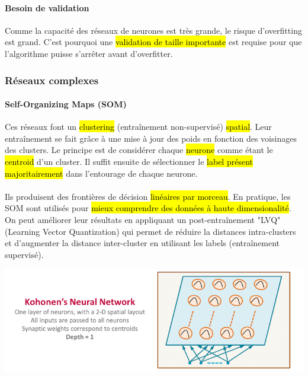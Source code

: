 \documentclass[letterpaper, 12pt]{article}
\newcommand{\alinea}{
\hspace*{0.5cm}}
\begin{document}
				\paragraph{Besoin de validation} Comme la capacité des réseaux de neurones est très grande, le risque d'overfitting est
						grand. 
						C'est pourquoi une \hl{validation de taille importante} est requise pour que l'algorithme puisse s'arrêter
						avant d'overfitter.
			\subsubsection{Réseaux complexes}
				\paragraph{Self-Organizing Maps (SOM)} Ces réseaux font un \hl{clustering} (entraînement non-supervisé) \hl{spatial}. 
						Leur entraînement se fait grâce à une mise à jour des poids en fonction des voisinages des clusters.
						Le principe est de considérer chaque \hl{neurone} comme étant le \hl{centroid} d'un cluster.
						Il suffit ensuite de sélectionner le \hl{label présent majoritairement} dans l'entourage de chaque neurone.\\
					~\\
					\alinea Ils produisent des frontières de décision \hl{linéaires par morceau}. En pratique, les SOM sont utilisés
						pour \hl{mieux comprendre des données à haute dimensionalité}. On peut améliorer leur résultats 
						en appliquant un post-entraînement "LVQ" (Learning Vector Quantization) qui permet de réduire la distances
						intra-clusters et d'augmenter la distance inter-cluster en utilisant les labels (entraînement supervisé).
					\begin{center}
						\includegraphics[width=6.5in]{Images/som}
					\end{center}
\end{document}
